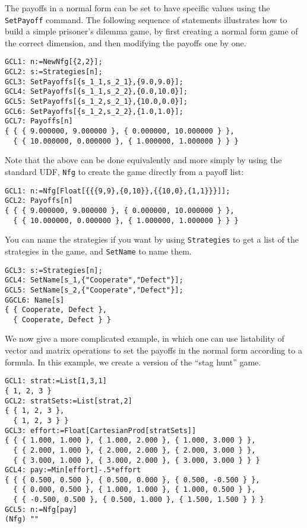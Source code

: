 The payoffs in a normal form can be set to have specific values using
the \verb+SetPayoff+ command.  The following sequence of statements
illustrates how to build a simple prisoner's dilemma game, by first
creating a normal form game of the correct dimension, and then
modifying the payoffs one by one.  

\begin{verbatim}
GCL1: n:=NewNfg[{2,2}];
GCL2: s:=Strategies[n];
GCL3: SetPayoffs[{s_1_1,s_2_1},{9.0,9.0}];
GCL4: SetPayoffs[{s_1_1,s_2_2},{0.0,10.0}];
GCL5: SetPayoffs[{s_1_2,s_2_1},{10.0,0.0}];
GCL6: SetPayoffs[{s_1_2,s_2_2},{1.0,1.0}];
GCL7: Payoffs[n]
{ { { 9.000000, 9.000000 }, { 0.000000, 10.000000 } },
  { { 10.000000, 0.000000 }, { 1.000000, 1.000000 } } }
\end{verbatim}

Note that the above can be done equivalently and more simply by using
the standard UDF, \verb+Nfg+ to create the game directly from a payoff
list:

\begin{verbatim}
GCL1: n:=Nfg[Float[{{{9,9},{0,10}},{{10,0},{1,1}}}]];
GCL2: Payoffs[n]
{ { { 9.000000, 9.000000 }, { 0.000000, 10.000000 } },
  { { 10.000000, 0.000000 }, { 1.000000, 1.000000 } } }
\end{verbatim}

\noindent
You can name the strategies if you want by using \verb+Strategies+ to
get a list of the strategies in the game, and \verb+SetName+ to name
them.

\begin{verbatim}
GCL3: s:=Strategies[n];
GCL4: SetName[s_1,{"Cooperate","Defect"}];
GCL5: SetName[s_2,{"Cooperate","Defect"}];  
GGCL6: Name[s]
{ { Cooperate, Defect },
  { Cooperate, Defect } }
\end{verbatim}

We now give a more complicated example, in which one can use
listability of vector and matrix operations to set the payoffs in the
normal form according to a formula.  In this example, we create a
version of the ``stag hunt'' game.

\begin{verbatim}
GCL1: strat:=List[1,3,1]
{ 1, 2, 3 }
GCL2: stratSets:=List[strat,2]
{ { 1, 2, 3 },
  { 1, 2, 3 } }
GCL3: effort:=Float[CartesianProd[stratSets]] 
{ { { 1.000, 1.000 }, { 1.000, 2.000 }, { 1.000, 3.000 } },
  { { 2.000, 1.000 }, { 2.000, 2.000 }, { 2.000, 3.000 } },
  { { 3.000, 1.000 }, { 3.000, 2.000 }, { 3.000, 3.000 } } }
GCL4: pay:=Min[effort]-.5*effort
{ { { 0.500, 0.500 }, { 0.500, 0.000 }, { 0.500, -0.500 } },
  { { 0.000, 0.500 }, { 1.000, 1.000 }, { 1.000, 0.500 } },
  { { -0.500, 0.500 }, { 0.500, 1.000 }, { 1.500, 1.500 } } }
GCL5: n:=Nfg[pay]
(Nfg) ""
\end{verbatim}

